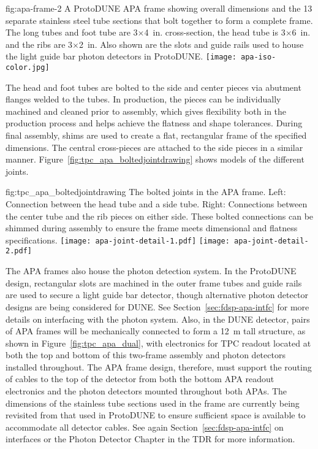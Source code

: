 \begin{dunefigure}{fig:apa-frame-2}
{A ProtoDUNE APA frame showing overall dimensions and the 13 separate stainless steel tube sections that bolt together to form a complete frame.  The long tubes and foot tube are 3$\times$\SI{4}{in}. cross-section, the head tube is 3$\times$\SI{6}{in}. and the ribs are 3$\times$\SI{2}{in}. Also shown are the slots and guide rails used to house the light guide bar photon detectors in ProtoDUNE.}
\texttt{[image: apa-iso-color.jpg]} 
\end{dunefigure}

The head and foot tubes are bolted to the side and center pieces via abutment flanges welded to the tubes. In production, the pieces can be individually machined and cleaned prior to assembly, which gives flexibility both in the production process and helps achieve the flatness and shape tolerances.  During final assembly, shims are used to create a flat, rectangular frame of the specified dimensions.  The central cross-pieces are attached to the side pieces in a similar manner.  Figure~\ref{fig:tpc_apa_boltedjointdrawing} shows models of the different joints.   

\begin{dunefigure}{fig:tpc_apa_boltedjointdrawing}
{The bolted joints in the APA frame. Left: Connection between the head tube and a side tube. Right: Connections between the center tube and the rib pieces on either side.  These bolted connections can be shimmed during assembly to ensure the frame meets dimensional and flatness specifications.}
\texttt{[image: apa-joint-detail-1.pdf]} \quad
\texttt{[image: apa-joint-detail-2.pdf]} 
\end{dunefigure}

The APA frames also house the photon detection system.  In the ProtoDUNE design, rectangular slots are machined in the outer frame tubes and guide rails are used to secure a light guide bar detector, though alternative photon detector designs are being considered for DUNE.  See Section~\ref{sec:fdsp-apa-intfc} for more details on interfacing with the photon system.  Also, in the DUNE detector, pairs of APA frames will be mechanically connected to form a \SI{12}{m} tall structure, as shown in Figure~\ref{fig:tpc_apa_dual}, with electronics for TPC readout located at both the top and bottom of this two-frame assembly and photon detectors installed throughout.  The APA frame design, therefore, must support the routing of cables to the top of the detector from both the bottom APA readout electronics and the photon detectors mounted throughout both APAs.  The dimensions of the stainless tube sections used in the frame are currently being revisited from that used in ProtoDUNE to ensure sufficient space is available to accommodate all detector cables.  See again Section~\ref{sec:fdsp-apa-intfc} on interfaces or the Photon Detector Chapter in the TDR for more information.

